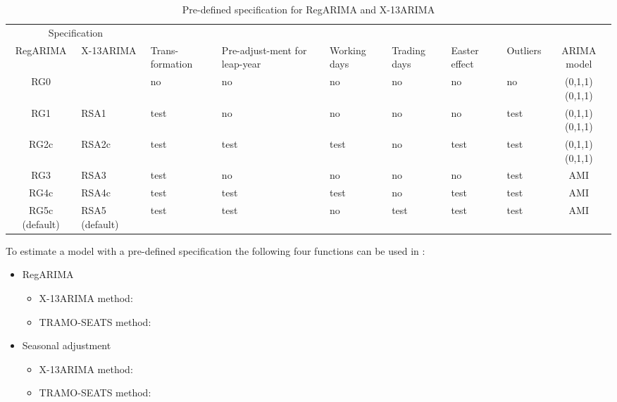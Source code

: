 \documentclass[article]{jss}
\providecommand{\tightlist}{%
  \setlength{\itemsep}{0pt}\setlength{\parskip}{0pt}}
\begin{document}
\begin{table}

\caption{\label{tab:pre_def_x13}Pre-defined specification for RegARIMA and X-13ARIMA}
\centering
\fontsize{7}{9}\selectfont
\begin{tabular}[t]{c>{\centering\arraybackslash}p{1.7cm}>{\centering\arraybackslash}p{}>{\centering\arraybackslash}p{1.4cm}>{\centering\arraybackslash}p{0.9cm}>{\centering\arraybackslash}p{0.9cm}>{\centering\arraybackslash}p{0.9cm}>{\centering\arraybackslash}p{0.9cm}c}
\toprule
\multicolumn{2}{c}{Specification} & \multicolumn{1}{c}{} \\
\cmidrule(l{2pt}r{2pt}){1-2}
RegARIMA & X-13ARIMA & Trans-formation & Pre-adjust-ment for leap-year & Working days & Trading days & Easter effect & Outliers & ARIMA model\\
\midrule
RG0 &  & no & no & no & no & no & no & (0,1,1)(0,1,1)\\
RG1 & RSA1 & test & no & no & no & no & test & (0,1,1)(0,1,1)\\
RG2c & RSA2c & test & test & test & no & test & test & (0,1,1)(0,1,1)\\
RG3 & RSA3 & test & no & no & no & no & test & AMI\\
RG4c & RSA4c & test & test & test & no & test & test & AMI\\
RG5c (default) & RSA5 (default) & test & test & no & test & test & test & AMI\\
\bottomrule
\end{tabular}
\end{table}

To estimate a model with a pre-defined specification the following four
functions can be used in :

\begin{itemize}
\tightlist
\item
  RegARIMA

  \begin{itemize}
  \tightlist
  \item
    X-13ARIMA method: 
  \item
    TRAMO-SEATS method: 
  \end{itemize}
\item
  Seasonal adjustment

  \begin{itemize}
  \tightlist
  \item
    X-13ARIMA method: 
  \item
    TRAMO-SEATS method: 
  \end{itemize}
\end{itemize}
\end{document}
